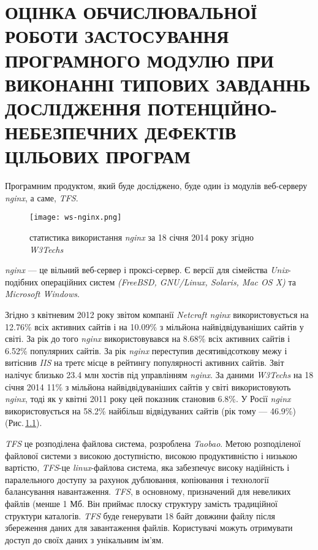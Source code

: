 \chapter{ОЦІНКА ОБЧИСЛЮВАЛЬНОЇ РОБОТИ ЗАСТОСУВАННЯ ПРОГРАМНОГО МОДУЛЮ ПРИ ВИКОНАННІ ТИПОВИХ ЗАВДАННЬ ДОСЛІДЖЕННЯ ПОТЕНЦІЙНО-НЕБЕЗПЕЧНИХ ДЕФЕКТІВ ЦІЛЬОВИХ ПРОГРАМ}
\label{4section::doc}\label{4section:id1}

Програмним продуктом, який буде досліджено, буде один із модулів веб-серверу {\it nginx}, а саме, {\it TFS}.

\begin{figure}[h]
    \centering
    \texttt{[image: ws-nginx.png]}
    \caption{статистика використання {\it nginx} за 18 січня 2014 року згідно {\it W3Techs} }
    \label{fig:nginx_statics_image}
\end{figure}

{\it nginx} — це вільний веб-сервер і проксі-сервер. Є версії для сімейства {\it Unix}-подібних операційних систем {\it(FreeBSD, GNU/Linux, Solaris, Mac OS X)} та {\it Microsoft Windows}.

Згідно з квітневим 2012 року звітом компанії {\it Netcraft nginx} використовується на 12.76\% всіх активних сайтів і на 10.09\% з мільйона найвідвідуваніших сайтів у світі. За рік до того {\it nginx} використовувався на 8.68\% всіх активних сайтів і 6.52\% популярних сайтів. За рік {\it nginx} переступив десятивідсоткову межу і витіснив {\it IIS} на третє місце в рейтингу популярності активних сайтів. Звіт налічує близько 23.4 млн хостів під управлінням {\it nginx}.
За даними {\it W3Techs} на 18 січня 2014 11\% з мільйона найвідвідуваніших сайтів у світі використовують {\it nginx}, тоді як у квітні 2011 року цей показник становив 6.8\%. У Росії {\it nginx} використовується на 58.2\% найбільш відвідуваних сайтів (рік тому — 46.9\%) (Рис.\,\ref{fig:nginx_statics_image}).

{\it TFS} це розподілена файлова система, розроблена {\it Taobao}.
Метою розподіленої файлової системи з високою доступністю, високою продуктивністю і низькою вартістю, {\it TFS}-це {\it linux}-файлова система, яка забезпечує високу надійність і паралельного доступу за рахунок дублювання, копіювання і технології балансування навантаження. {\it TFS}, в основному, призначений для невеликих файлів (менше 1 Мб. Він приймає плоску структуру замість традиційної структури каталогів. {\it TFS} буде генерувати 18 байт довжини файлу після збереження даних для завантаження файлів. Користувачі можуть отримувати доступ до своїх даних з унікальним ім'ям.


